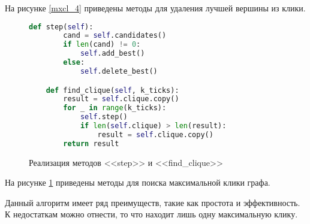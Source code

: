 На рисунке \ref{mxcl_4} приведены методы для удаления 
лучшей вершины из клики.
\begin{figure}[H] 
\begin{lstlisting}[language=Python] 
    def step(self):
        cand = self.candidates()
        if len(cand) != 0:
            self.add_best()
        else:
            self.delete_best()

    def find_clique(self, k_ticks):
        result = self.clique.copy()
        for _ in range(k_ticks):
            self.step()
            if len(self.clique) > len(result):
                result = self.clique.copy()
        return result
\end{lstlisting}  
    \caption{Реализация методов <<step>> и <<find\_clique>>}
    \label{mxcl_5}
\end{figure} 
На рисунке \ref{mxcl_5} приведены методы для поиска максимальной клики графа.

Данный алгоритм имеет ряд преимуществ, такие как простота и эффективность. К недостаткам можно отнести, то что находит лишь одну 
максимальную клику.
